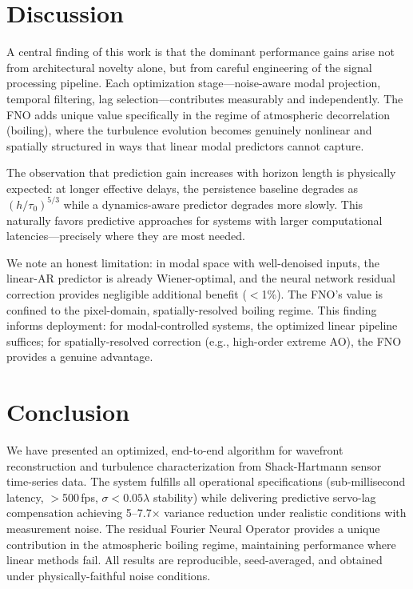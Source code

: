 \documentclass[conference]{IEEEtran}
\begin{document}
\section{Discussion}

A central finding of this work is that the dominant performance gains arise not from architectural novelty alone, but from careful engineering of the signal processing pipeline. Each optimization stage---noise-aware modal projection, temporal filtering, lag selection---contributes measurably and independently. The FNO adds unique value specifically in the regime of atmospheric decorrelation (boiling), where the turbulence evolution becomes genuinely nonlinear and spatially structured in ways that linear modal predictors cannot capture.

The observation that prediction gain increases with horizon length is physically expected: at longer effective delays, the persistence baseline degrades as $(h/\tau_0)^{5/3}$ while a dynamics-aware predictor degrades more slowly. This naturally favors predictive approaches for systems with larger computational latencies---precisely where they are most needed.

We note an honest limitation: in modal space with well-denoised inputs, the linear-AR predictor is already Wiener-optimal, and the neural network residual correction provides negligible additional benefit ($<$1\%). The FNO's value is confined to the pixel-domain, spatially-resolved boiling regime. This finding informs deployment: for modal-controlled systems, the optimized linear pipeline suffices; for spatially-resolved correction (e.g., high-order extreme AO), the FNO provides a genuine advantage.

\section{Conclusion}

We have presented an optimized, end-to-end algorithm for wavefront reconstruction and turbulence characterization from Shack-Hartmann sensor time-series data. The system fulfills all operational specifications (sub-millisecond latency, $>$500\,fps, $\sigma<0.05\lambda$ stability) while delivering predictive servo-lag compensation achieving 5--7.7$\times$ variance reduction under realistic conditions with measurement noise. The residual Fourier Neural Operator provides a unique contribution in the atmospheric boiling regime, maintaining performance where linear methods fail. All results are reproducible, seed-averaged, and obtained under physically-faithful noise conditions.
\end{document}
